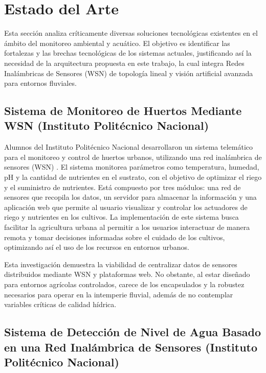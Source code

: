 \chapter{Estado del Arte}

Esta sección analiza críticamente diversas soluciones tecnológicas existentes en el ámbito del monitoreo ambiental y acuático. El objetivo es identificar las fortalezas y las brechas tecnológicas de los sistemas actuales, justificando así la necesidad de la arquitectura propuesta en este trabajo, la cual integra Redes Inalámbricas de Sensores (WSN) de topología lineal y visión artificial avanzada para entornos fluviales.

\section{Sistema de Monitoreo de Huertos Mediante WSN (Instituto Politécnico Nacional)}

Alumnos del Instituto Politécnico Nacional desarrollaron un sistema telemático para el monitoreo y control de huertos urbanos, utilizando una red inalámbrica de sensores (WSN) \cite{benitez2024}. El sistema monitorea parámetros como temperatura, humedad, pH y la cantidad de nutrientes en el sustrato, con el objetivo de optimizar el riego y el suministro de nutrientes. Está compuesto por tres módulos: una red de sensores que recopila los datos, un servidor para almacenar la información y una aplicación web que permite al usuario visualizar y controlar los actuadores de riego y nutrientes en los cultivos. La implementación de este sistema busca facilitar la agricultura urbana al permitir a los usuarios interactuar de manera remota y tomar decisiones informadas sobre el cuidado de los cultivos, optimizando así el uso de los recursos en entornos urbanos.

Esta investigación demuestra la viabilidad de centralizar datos de sensores distribuidos mediante WSN y plataformas web. No obstante, al estar diseñado para entornos agrícolas controlados, carece de los encapsulados y la robustez necesarios para operar en la intemperie fluvial, además de no contemplar variables críticas de calidad hídrica.
\newpage

\section{Sistema de Detección de Nivel de Agua Basado en una Red Inalámbrica de Sensores (Instituto Politécnico Nacional)}

